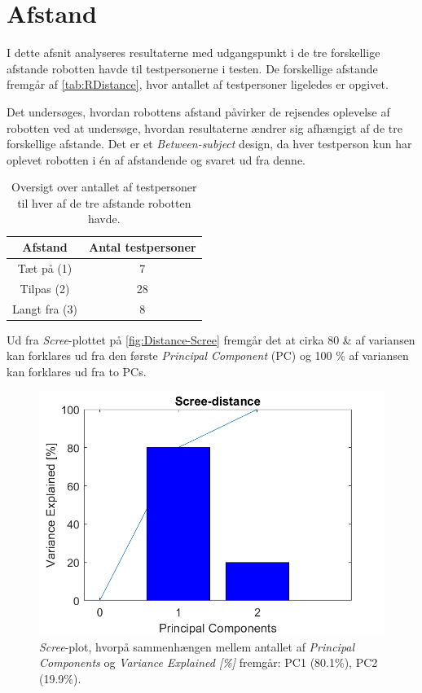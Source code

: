 \section{Afstand}
\label{DatabehandlingRAfstand}
%
I dette afsnit analyseres resultaterne med udgangspunkt i de tre forskellige afstande robotten havde til testpersonerne i testen. De forskellige afstande fremgår af \autoref{tab:RDistance}, hvor antallet af testpersoner ligeledes er opgivet. 

Det undersøges, hvordan robottens afstand påvirker de rejsendes oplevelse af robotten ved at undersøge, hvordan resultaterne ændrer sig afhængigt af de tre forskellige afstande. Det er et \textit{Between-subject} design, da hver testperson kun har oplevet robotten i én af afstandende og svaret ud fra denne.
%
\begin{table}[H]
\centering
\begin{tabular}{c|c}
Afstand & Antal testpersoner \\ \hline
Tæt på (1) & 7    \\ \hline
Tilpas (2) & 28    \\ \hline
Langt fra (3) & 8     \\ 
\end{tabular}
\caption{Oversigt over antallet af testpersoner til hver af de tre afstande robotten havde.}
\label{tab:RDistance}
\end{table}
\noindent
%
Ud fra \textit{Scree}-plottet på \autoref{fig:Distance-Scree} fremgår det at cirka 80 \& af variansen kan forklares ud fra den første \textit{Principal Component} (PC) og 100 \% af variansen kan forklares ud fra to PCs. 
%
\begin{figure}[H]
\centering
\includegraphics[width=\textwidth]{Figure/DatabehandlingSkalaer/PCAfigures/Distance-Scree.png}
\caption{\textit{Scree}-plot, hvorpå sammenhængen mellem antallet af \textit{Principal Components} og \textit{Variance Explained [\%]} fremgår: PC1 (80.1\%), PC2 (19.9\%).}
\label{fig:Distance-Scree}
\end{figure}
